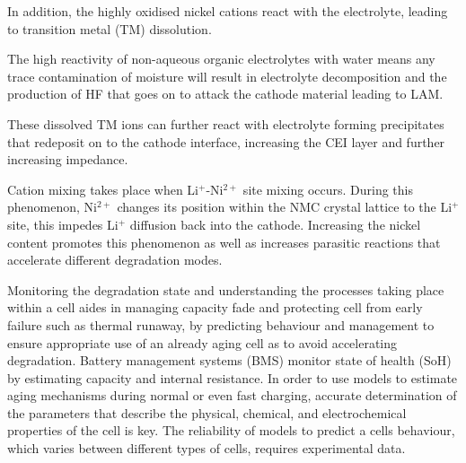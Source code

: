 \documentclass[aps,prb,twocolumn,superscriptaddress,reprint]{revtex4-1}
\begin{document}
In addition, the highly oxidised nickel cations react with the electrolyte, leading to transition metal (TM) dissolution.  

The high reactivity of non-aqueous organic electrolytes with water means any trace contamination of moisture will result in electrolyte decomposition and the production of HF that goes on to attack the cathode material leading to LAM.\cite{Zheng2012} 

These dissolved TM ions can further react with electrolyte forming precipitates that redeposit on to the cathode interface, increasing the CEI layer and further increasing impedance.\cite{Zheng2012} 

Cation mixing takes place when Li$^{+}$-Ni$^{2+}$ site mixing occurs. During this phenomenon, Ni$^{2+}$ changes its position within the NMC crystal lattice to the Li$^{+}$ site, this impedes Li$^{+}$ diffusion back into the cathode.\cite{Sari2019} Increasing the nickel content promotes this phenomenon as well as increases parasitic reactions that accelerate different degradation modes.\cite{erickson2017recent} 

Monitoring the degradation state and understanding the processes taking place within a cell aides in managing capacity fade and protecting cell from early failure such as thermal runaway, by predicting behaviour and management to ensure appropriate use of an already aging cell as to avoid accelerating degradation. Battery management systems (BMS) monitor  state of health (SoH) by estimating capacity and internal resistance. In order to use models to estimate aging mechanisms during normal or even fast charging, accurate determination of the parameters that describe the physical, chemical, and electrochemical properties of the cell is key. The reliability of models to predict a cells behaviour, which varies between different types of cells, requires experimental data.
\end{document}
